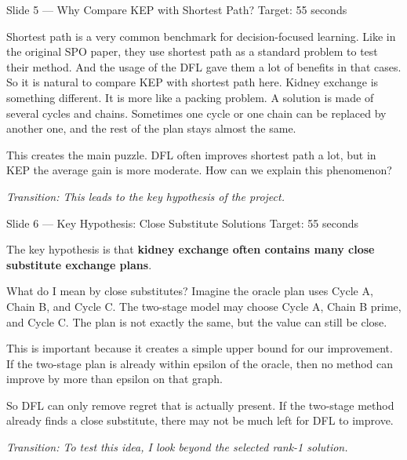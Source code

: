 \documentclass[11pt,aspectratio=169]{beamer}
\newcommand{\kw}[1]{\textcolor{navyblue}{\textbf{#1}}}
\newcommand{\tr}[1]{\vspace{0.35em}\textit{\textcolor{black!55}{Transition: #1}}}
\newcommand{\timing}[1]{\textcolor{black!45}{\scriptsize Target: #1}\par\vspace{0.25em}}
\begin{document}
\begin{frame}{Slide 5 \enspace\textmd{\small\textcolor{black!40}{--- Why Compare KEP with Shortest Path?}}}
\small
\timing{55 seconds}

Shortest path is a very common benchmark for decision-focused learning. Like in the original SPO paper, they use shortest path as a standard problem to test their method. And the usage of the DFL gave them a lot of benefits in that cases. So it is natural to compare KEP with shortest path here.
\vspace{0.35em}
Kidney exchange is something different. It is more like a packing problem. A solution is made of several cycles and chains. Sometimes one cycle or one chain can be replaced by another one, and the rest of the plan stays almost the same.

\vspace{0.35em}
This creates the main puzzle. DFL often improves shortest path a lot, but in KEP the average gain is more moderate. How can we explain this phenomenon? 

\tr{This leads to the key hypothesis of the project.}
\end{frame}

\begin{frame}{Slide 6 \enspace\textmd{\small\textcolor{black!40}{--- Key Hypothesis: Close Substitute Solutions}}}
\small
\timing{55 seconds}

The key hypothesis is that \kw{kidney exchange often contains many close substitute exchange plans}.

\vspace{0.35em}
What do I mean by close substitutes? Imagine the oracle plan uses Cycle A, Chain B, and Cycle C. The two-stage model may choose Cycle A, Chain B prime, and Cycle C. The plan is not exactly the same, but the value can still be close.

\vspace{0.35em}
This is important because it creates a simple upper bound for our improvement. If the two-stage plan is already within epsilon of the oracle, then no method can improve by more than epsilon on that graph.

\vspace{0.35em}
So DFL can only remove regret that is actually present. If the two-stage method already finds a close substitute, there may not be much left for DFL to improve.

\tr{To test this idea, I look beyond the selected rank-1 solution.}
\end{frame}
\end{document}
